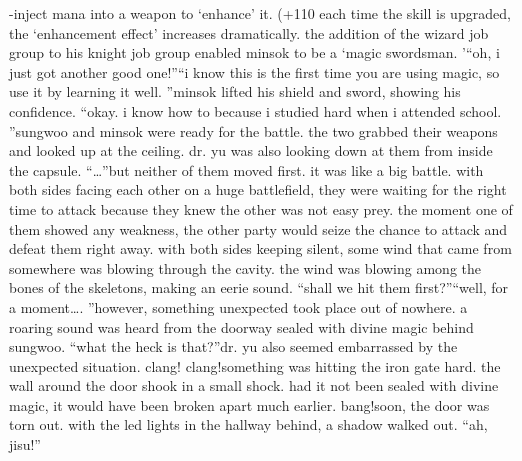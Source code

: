 -inject mana into a weapon to ‘enhance’ it.
 (+110%
 each time the skill is upgraded, the ‘enhancement effect’ increases dramatically.
the addition of the wizard job group to his knight job group enabled minsok to be a ‘magic swordsman.
’“oh, i just got another good one!”“i know this is the first time you are using magic, so use it by learning it well.
”minsok lifted his shield and sword, showing his confidence.
“okay.
 i know how to because i studied hard when i attended school.
”sungwoo and minsok were ready for the battle.
the two grabbed their weapons and looked up at the ceiling.
 dr.
 yu was also looking down at them from inside the capsule.
“…”but neither of them moved first.
 it was like a big battle.
 with both sides facing each other on a huge battlefield, they were waiting for the right time to attack because they knew the other was not easy prey.
 the moment one of them showed any weakness, the other party would seize the chance to attack and defeat them right away.
with both sides keeping silent, some wind that came from somewhere was blowing through the cavity.
 the wind was blowing among the bones of the skeletons, making an eerie sound.
“shall we hit them first?”“well, for a moment….
”however, something unexpected took place out of nowhere.
a roaring sound was heard from the doorway sealed with divine magic behind sungwoo.
“what the heck is that?”dr.
 yu also seemed embarrassed by the unexpected situation.
clang! clang!something was hitting the iron gate hard.
 the wall around the door shook in a small shock.
had it not been sealed with divine magic, it would have been broken apart much earlier.
bang!soon, the door was torn out.
 with the led lights in the hallway behind, a shadow walked out.
“ah, jisu!”

 